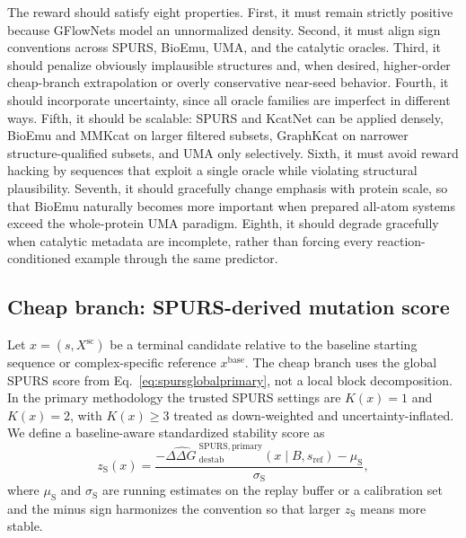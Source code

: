 \documentclass[11pt]{article}
\newcommand{\ddG}{\ensuremath{\Delta\Delta G \ }}
\begin{document}
	The reward should satisfy eight properties. First, it must remain strictly positive because GFlowNets model an unnormalized density. Second, it must align sign conventions across SPURS, BioEmu, UMA, and the catalytic oracles. Third, it should penalize obviously implausible structures and, when desired, higher-order cheap-branch extrapolation or overly conservative near-seed behavior. Fourth, it should incorporate uncertainty, since all oracle families are imperfect in different ways. Fifth, it should be scalable: SPURS and KcatNet can be applied densely, BioEmu and MMKcat on larger filtered subsets, GraphKcat on narrower structure-qualified subsets, and UMA only selectively. Sixth, it must avoid reward hacking by sequences that exploit a single oracle while violating structural plausibility. Seventh, it should gracefully change emphasis with protein scale, so that BioEmu naturally becomes more important when prepared all-atom systems exceed the whole-protein UMA paradigm. Eighth, it should degrade gracefully when catalytic metadata are incomplete, rather than forcing every reaction-conditioned example through the same predictor.
	
	
	\subsection{Cheap branch: SPURS-derived mutation score}
	
	Let $x=(s,X^{\mathrm{sc}})$ be a terminal candidate relative to the baseline starting sequence or complex-specific reference $x^{\mathrm{base}}$. The cheap branch uses the global SPURS score from Eq.~\eqref{eq:spursglobalprimary}, not a local block decomposition. In the primary methodology the trusted SPURS settings are $K(x)=1$ and $K(x)=2$, with $K(x)\ge 3$ treated as down-weighted and uncertainty-inflated. We define a baseline-aware standardized stability score as
	\begin{equation}
		z_{\mathrm S}(x)=\frac{-\widehat{\ddG}^{\mathrm{SPURS,primary}}_{\mathrm{destab}}(x\mid B,s_{\mathrm{ref}})-\mu_{\mathrm S}}{\sigma_{\mathrm S}},
	\end{equation}
	where $\mu_{\mathrm S}$ and $\sigma_{\mathrm S}$ are running estimates on the replay buffer or a calibration set and the minus sign harmonizes the convention so that larger $z_{\mathrm S}$ means more stable.
	
\end{document}
